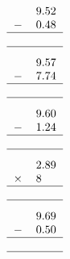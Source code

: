 \documentclass[leqno, 12pt]{article}
\begin{document}
\begin{multicols}{3}
\vspace{-1pt}%
\begin{equation}
    \raisebox{-0.8cm}{
        \begin{tabular}{c S[table-format=1.2]}
         &9.52 \tabularnewline
        $-$&0.48 \tabularnewline
        \hline
         & \tabularnewline
        \hline
    \end{tabular}}
\end{equation}
\vspace{-1pt}%
\begin{equation}
    \raisebox{-0.8cm}{
        \begin{tabular}{c S[table-format=1.2]}
         &9.57 \tabularnewline
        $-$&7.74 \tabularnewline
        \hline
         & \tabularnewline
        \hline
    \end{tabular}}
\end{equation}
\vspace{-1pt}%
\begin{equation}
    \raisebox{-0.8cm}{
        \begin{tabular}{c S[table-format=1.2]}
         &9.60 \tabularnewline
        $-$&1.24 \tabularnewline
        \hline
         & \tabularnewline
        \hline
    \end{tabular}}
\end{equation}
\vspace{-1pt}%
\begin{equation}
    \raisebox{-0.8cm}{
        \begin{tabular}{c S[table-format=1.2]}
         &2.89 \tabularnewline
        $\times$&8 \tabularnewline
        \hline
         & \tabularnewline
        \hline
    \end{tabular}}
\end{equation}
\vspace{-1pt}%
\begin{equation}
    \raisebox{-0.8cm}{
        \begin{tabular}{c S[table-format=1.2]}
         &9.69 \tabularnewline
        $-$&0.50 \tabularnewline
        \hline
         & \tabularnewline
        \hline
    \end{tabular}}
\end{equation}
\vspace{-1pt}%
\begin{equation}
    \raisebox{-0.8cm}{
        \begin{tabular}{c S[table-format=1.2]}

\end{tabular}}
\end{equation}
\end{multicols}
\end{document}
